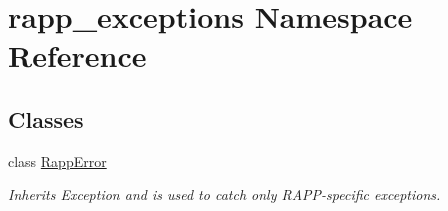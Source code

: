 \hypertarget{namespacerapp__exceptions}{\section{rapp\-\_\-exceptions Namespace Reference}
\label{namespacerapp__exceptions}
}
\subsection*{Classes}
\begin{DoxyCompactItemize}
\item 
class \hyperlink{classrapp__exceptions_1_1RappError}{Rapp\-Error}
\begin{DoxyCompactList}\small\item\em Inherits Exception and is used to catch only R\-A\-P\-P-\/specific exceptions. \end{DoxyCompactList}\end{DoxyCompactItemize}

